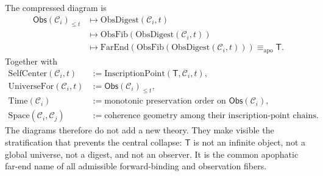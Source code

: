 The compressed diagram is
$$
\begin{aligned}
\mathsf{Obs}(\mathcal{C}_i)_{\leq t}
&\longmapsto
\mathrm{ObsDigest}(\mathcal{C}_i,t)\\
&\longmapsto
\mathrm{ObsFib}(\mathrm{ObsDigest}(\mathcal{C}_i,t))\\
&\longmapsto
\mathrm{FarEnd}(\mathrm{ObsFib}(\mathrm{ObsDigest}(\mathcal{C}_i,t)))
\equiv_{\mathrm{apo}} \mathsf{T}.
\end{aligned}
$$
Together with
$$
\begin{aligned}
\mathrm{SelfCenter}(\mathcal{C}_i,t)
&:=
\mathrm{InscriptionPoint}(\mathsf{T},\mathcal{C}_i,t),\\
\mathrm{UniverseFor}(\mathcal{C}_i,t)
&:=
\mathsf{Obs}(\mathcal{C}_i)_{\leq t},\\
\mathrm{Time}(\mathcal{C}_i)
&:=
\text{monotonic preservation order on }\mathsf{Obs}(\mathcal{C}_i),\\
\mathrm{Space}(\mathcal{C}_i,\mathcal{C}_j)
&:=
\text{coherence geometry among their inscription-point chains}.
\end{aligned}
$$
The diagrams therefore do not add a new theory. They make visible the
stratification that prevents the central collapse: $\mathsf{T}$ is not an
infinite object, not a global universe, not a digest, and not an observer. It
is the common apophatic far-end name of all admissible forward-binding and
observation fibers.

